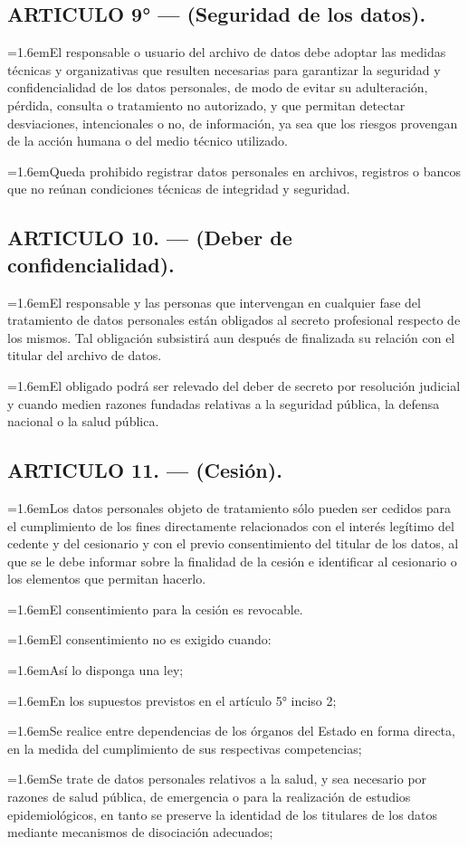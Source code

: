 \documentclass[10pt,a4paper]{article}
\newcommand{\articulo}[1]{\subsection{#1}}
\newcommand{\inciso}[2]{\par{\hangindent=1.6em\hangafter=1\makebox[1.6em][l]{#1}#2\par}}
\begin{document}
\articulo{ARTICULO 9° — (Seguridad de los datos).}
\inciso{1.}{El responsable o usuario del archivo de datos debe adoptar las medidas técnicas y organizativas que resulten necesarias para garantizar la seguridad y confidencialidad de los datos personales, de modo de evitar su adulteración, pérdida, consulta o tratamiento no autorizado, y que permitan detectar desviaciones, intencionales o no, de información, ya sea que los riesgos provengan de la acción humana o del medio técnico utilizado.}

\inciso{2.}{Queda prohibido registrar datos personales en archivos, registros o bancos que no reúnan condiciones técnicas de integridad y seguridad.}

\articulo{ARTICULO 10. — (Deber de confidencialidad).}
\inciso{1.}{El responsable y las personas que intervengan en cualquier fase del tratamiento de datos personales están obligados al secreto profesional respecto de los mismos. Tal obligación subsistirá aun después de finalizada su relación con el titular del archivo de datos.}

\inciso{2.}{El obligado podrá ser relevado del deber de secreto por resolución judicial y cuando medien razones fundadas relativas a la seguridad pública, la defensa nacional o la salud pública.}

\articulo{ARTICULO 11. — (Cesión).}
\inciso{1.}{Los datos personales objeto de tratamiento sólo pueden ser cedidos para el cumplimiento de los fines directamente relacionados con el interés legítimo del cedente y del cesionario y con el previo consentimiento del titular de los datos, al que se le debe informar sobre la finalidad de la cesión e identificar al cesionario o los elementos que permitan hacerlo.}

\inciso{2.}{El consentimiento para la cesión es revocable.}

\inciso{3.}{El consentimiento no es exigido cuando:}

\inciso{a)}{Así lo disponga una ley;}

\inciso{b)}{En los supuestos previstos en el artículo 5° inciso 2;}

\inciso{c)}{Se realice entre dependencias de los órganos del Estado en forma directa, en la medida del cumplimiento de sus respectivas competencias;}

\inciso{d)}{Se trate de datos personales relativos a la salud, y sea necesario por razones de salud pública, de emergencia o para la realización de estudios epidemiológicos, en tanto se preserve la identidad de los titulares de los datos mediante mecanismos de disociación adecuados;}
\end{document}
